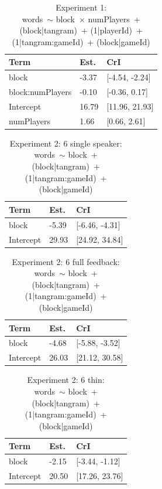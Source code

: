 \documentclass[
  english,
  a4paper,
]{article}
\begin{document}
\begin{table}[h!]

\caption{\label{tab:unnamed-chunk-11}Experiment 1:\\ words~$\sim$ block~$\times$ numPlayers~+ (block|tangram)~+ (1|playerId)~+ (1|tangram:gameId)~+ (block|gameId)}
\centering
\begin{tabular}[t]{lll}
\toprule
Term & Est. & CrI\\
\midrule
block & -3.37 & {}[-4.54, -2.24]\\
block:numPlayers & -0.10 & {}[-0.36, 0.17]\\
Intercept & 16.79 & {}[11.96, 21.93]\\
numPlayers & 1.66 & {}[0.66, 2.61]\\
\bottomrule
\end{tabular}
\end{table}

\begin{table}[h!]

\caption{\label{tab:unnamed-chunk-11}Experiment 2: 6 single speaker:\\ words~$\sim$ block~+ (block|tangram)~+ (1|tangram:gameId)~+ (block|gameId)}
\centering
\begin{tabular}[t]{lll}
\toprule
Term & Est. & CrI\\
\midrule
block & -5.39 & {}[-6.46, -4.31]\\
Intercept & 29.93 & {}[24.92, 34.84]\\
\bottomrule
\end{tabular}
\end{table}

\begin{table}[h!]

\caption{\label{tab:unnamed-chunk-11}Experiment 2: 6 full feedback:\\ words~$\sim$ block~+ (block|tangram)~+ (1|tangram:gameId)~+ (block|gameId)}
\centering
\begin{tabular}[t]{lll}
\toprule
Term & Est. & CrI\\
\midrule
block & -4.68 & {}[-5.88, -3.52]\\
Intercept & 26.03 & {}[21.12, 30.58]\\
\bottomrule
\end{tabular}
\end{table}

\begin{table}[h!]

\caption{\label{tab:unnamed-chunk-11}Experiment 2: 6 thin:\\ words~$\sim$ block~+ (block|tangram)~+ (1|tangram:gameId)~+ (block|gameId)}
\centering
\begin{tabular}[t]{lll}
\toprule
Term & Est. & CrI\\
\midrule
block & -2.15 & {}[-3.44, -1.12]\\
Intercept & 20.50 & {}[17.26, 23.76]\\
\bottomrule
\end{tabular}
\end{table}
\end{document}
